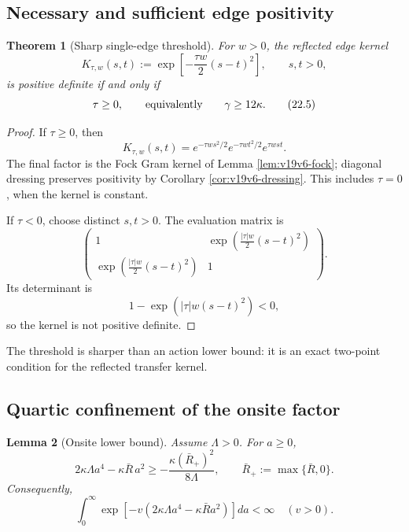 \documentclass[11pt]{article}
\newtheorem{theorem}{Theorem}[section]
\newtheorem{lemma}[theorem]{Lemma}
\theoremstyle{remark}
\begin{document}
\subsection{Necessary and sufficient edge positivity}

\begin{theorem}[Sharp single-edge threshold]
\label{thm:v19v19-edge}
For \(w>0\), the reflected edge kernel
\[
 K_{\tau,w}(s,t)
 :=\exp\!\left[-\frac{\tau w}{2}(s-t)^2\right],
 \qquad s,t>0,                                                 \tag{22.4}
\]
is positive definite if and only if
\[
 \tau\geq0,\qquad\hbox{equivalently}\qquad\gamma\geq12\kappa. \tag{22.5}
\]
\end{theorem}

\begin{proof}
If \(\tau\geq0\), then
\[
 K_{\tau,w}(s,t)
 =
 e^{-\tau ws^2/2}e^{-\tau wt^2/2}e^{\tau wst}.                 \tag{22.6}
\]
The final factor is the Fock Gram kernel of Lemma
\ref{lem:v19v6-fock}; diagonal dressing preserves positivity by
Corollary \ref{cor:v19v6-dressing}.  This includes \(\tau=0\), when the
kernel is constant.

If \(\tau<0\), choose distinct \(s,t>0\).  The evaluation matrix is
\[
 \begin{pmatrix}
 1&\exp\!\left(\frac{|\tau|w}{2}(s-t)^2\right)\\
 \exp\!\left(\frac{|\tau|w}{2}(s-t)^2\right)&1
 \end{pmatrix}.
\]
Its determinant is
\[
 1-\exp\!\left(|\tau|w(s-t)^2\right)<0,                       \tag{22.7}
\]
so the kernel is not positive definite.
\end{proof}

The threshold is sharper than an action lower bound: it is an exact
two-point condition for the reflected transfer kernel.

\subsection{Quartic confinement of the onsite factor}

\begin{lemma}[Onsite lower bound]
\label{lem:v19v19-onsite}
Assume \(\Lambda>0\).  For \(a\geq0\),
\[
 2\kappa\Lambda a^4-\kappa\bar R\,a^2
 \geq-\frac{\kappa(\bar R_+)^2}{8\Lambda},
 \qquad \bar R_+:=\max\{\bar R,0\}.                            \tag{22.8}
\]
Consequently,
\[
 \int_0^\infty
 \exp\!\left[-v(2\kappa\Lambda a^4-\kappa\bar R a^2)\right]da
 <\infty
 \quad(v>0).                                                   \tag{22.9}
\]
\end{lemma}
\end{document}
